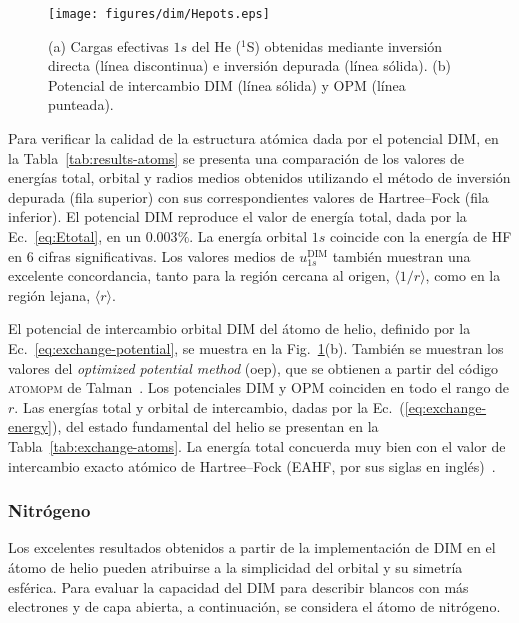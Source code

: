 \begin{figure}[t]
\centering
\texttt{[image: figures/dim/Hepots.eps]}
\caption[Cargas efectivas y potencial de intercambio DIM de He.]
{(a) Cargas efectivas $1s$ del He ($^1$S) obtenidas mediante inversión 
directa (línea discontinua) e inversión depurada (línea sólida). 
(b) Potencial de intercambio DIM (línea sólida) y OPM (línea punteada).}
\label{fig:Hepots}
\end{figure}

Para verificar la calidad de la estructura atómica dada por el potencial 
DIM, en la Tabla~\ref{tab:results-atoms} se presenta una comparación 
de los valores de energías total, orbital y radios medios obtenidos 
utilizando el método de inversión depurada (fila superior) con sus 
correspondientes valores de Hartree--Fock (fila inferior). El potencial 
DIM reproduce el valor de energía total, dada por la 
Ec.~\ref{eq:Etotal}, en un $0.003\%$. La energía orbital $1s$ coincide 
con la energía de HF en 6 cifras significativas. Los valores medios de 
$u_{1s}^{\mathrm{DIM}}$ también muestran una excelente concordancia, 
tanto para la región cercana al origen, $\langle 1/r\rangle$, como en la 
región lejana, $\langle r\rangle$.

El potencial de intercambio orbital DIM del átomo de helio, definido por 
la Ec.~\ref{eq:exchange-potential}, se muestra en la 
Fig.~\ref{fig:Hepots}(b). También se muestran los valores del 
\textit{optimized potential method} (\acs{oep}), que se obtienen a 
partir del código \textsc{atomopm} de Talman~\cite{Talman:76,Talman:89}. 
Los potenciales DIM y OPM coinciden en todo el rango de $r$. Las 
energías total y orbital de intercambio, dadas por la 
Ec.~(\ref{eq:exchange-energy}), del estado fundamental del helio se 
presentan en la Tabla~\ref{tab:exchange-atoms}. La energía total 
concuerda muy bien con el valor de intercambio exacto atómico de 
Hartree--Fock (EAHF, por sus siglas en inglés)~\cite{Becke:88}.

\subsubsection*{Nitrógeno}

Los excelentes resultados obtenidos a partir de la implementación de DIM 
en el átomo de helio pueden atribuirse a la simplicidad del orbital y su 
simetría esférica. Para evaluar la capacidad del DIM para describir 
blancos con más electrones y de capa abierta, a continuación, se 
considera el átomo de nitrógeno. 

